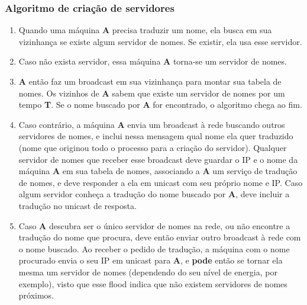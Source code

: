     \subsubsection{Algoritmo de criação de servidores}
        \begin{enumerate}
            \item Quando uma máquina \textbf{A} precisa traduzir um nome, ela
            busca em sua vizinhança se existe algum servidor de nomes. Se existir,
            ela usa esse servidor.
            \item Caso não exista servidor, essa máquina \textbf{A} torna-se um 
            servidor de nomes.
            \item \textbf{A} então faz um broadcast em sua vizinhança para montar
            sua tabela de nomes. Os vizinhos de \textbf{A} sabem que existe um
            servidor de nomes por um tempo \textbf{T}. Se o nome buscado por
            \textbf{A} for encontrado, o algoritmo chega ao fim.
            \item Caso contrário, a máquina \textbf{A} envia um broadcast à rede
            buscando outros servidores de nomes, e inclui nessa mensagem qual nome
            ela quer traduzido (nome que originou todo o processo para a criação
            do servidor). Qualquer servidor de nomes que receber esse broadcast
            deve guardar o IP e o nome da máquina \textbf{A} em sua tabela de nomes,
            associando a \textbf{A} um serviço de tradução de nomes, e deve
            responder a ela em unicast com seu próprio nome e IP. Caso algum
            servidor conheça a tradução do nome buscado por \textbf{A}, deve
            incluir a tradução no unicast de resposta.
            \item Caso \textbf{A} descubra ser o único servidor de nomes na rede,
            ou não encontre a tradução do nome que procura, deve então enviar
            outro broadcast à rede com o nome buscado. Ao receber o pedido de
            tradução, a máquina com o nome procurado envia o seu IP em unicast
            para \textbf{A}, e \textbf{pode} então se tornar ela mesma um servidor
            de nomes (dependendo do seu nível de energia, por exemplo), visto que
            esse flood indica que não existem servidores de nomes próximos.
        \end{enumerate}
    
